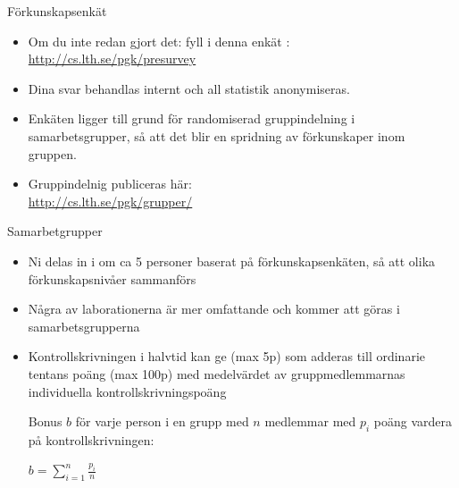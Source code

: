 \begin{Slide}{Förkunskapsenkät}
\begin{itemize}
\item Om du inte redan gjort det: fyll i denna enkät :\\
\url{http://cs.lth.se/pgk/presurvey} \\
\item Dina svar behandlas internt och all statistik anonymiseras.
\item Enkäten ligger till grund för randomiserad gruppindelning i samarbetsgrupper, så att det blir en spridning av förkunskaper inom gruppen.
\item Gruppindelnig publiceras här: \\ \url{http://cs.lth.se/pgk/grupper/}
\end{itemize}
\end{Slide}

\begin{Slide}{Samarbetgrupper}\footnotesize
\begin{itemize}
\item Ni delas in i  om ca 5 personer baserat på förkunskapsenkäten, så att olika förkunskapsnivåer sammanförs
\item Några av laborationerna är mer omfattande  och kommer att göras i samarbetsgrupperna \\ \vspace{1em}
\item Kontrollskrivningen i halvtid kan ge  (max 5p) som adderas till ordinarie tentans poäng (max 100p) med medelvärdet av gruppmedlemmarnas individuella kontrollskrivningspoäng 
\scriptsize \parbox{7cm}{Bonus $b$ för varje person i en grupp med $n$ medlemmar med $p_i$ poäng vardera på kontrollskrivningen:} 
 \hspace{5mm} $\displaystyle b = \sum\limits_{i=1}^n \frac{p_i}{n}$
\end{itemize}
\end{Slide}

\fi

